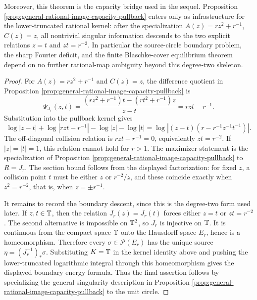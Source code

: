 \begin{theorem}
Moreover, this theorem is the capacity bridge used in the sequel.  Proposition \ref{prop:general-rational-image-capacity-pullback} enters only as infrastructure for the lower-truncated rational kernel: after the specialization \(A(z)=rz^2+r^{-1}\), \(C(z)=z\), all nontrivial singular information descends to the two explicit relations \(z=t\) and \(zt=r^{-2}\).  In particular the source-circle boundary problem, the sharp Fourier deficit, and the finite Blaschke-cover equilibrium theorem depend on no further rational-map ambiguity beyond this degree-two skeleton.
\end{theorem}

\begin{proof}
For \(A(z)=rz^2+r^{-1}\) and \(C(z)=z\), the difference quotient in Proposition \ref{prop:general-rational-image-capacity-pullback} is
\[
\Psi_{J_r}(z,t)=\frac{(rz^2+r^{-1})t-(rt^2+r^{-1})z}{z-t}
=rzt-r^{-1}.
\]
Substitution into the pullback kernel gives
\[
\log|z-t|+
\log|rzt-r^{-1}|-
\log|z|-
\log|t|
=
\log\left|(z-t)\left(r-r^{-1}z^{-1}t^{-1}\right)\right|.
\]
The off-diagonal collision relation is \(rzt-r^{-1}=0\), equivalently \(zt=r^{-2}\).  If \(|z|=|t|=1\), this relation cannot hold for \(r>1\).  The maximizer statement is the specialization of Proposition \ref{prop:general-rational-image-capacity-pullback} to \(R=J_r\).  The section bound follows from the displayed factorization: for fixed \(z\), a collision point \(t\) must be either \(z\) or \(r^{-2}/z\), and these coincide exactly when \(z^2=r^{-2}\), that is, when \(z=\pm r^{-1}\).

It remains to record the boundary descent, since this is the degree-two form used later.  If \(z,t\in\mathbb{T}\), then the relation \(J_r(z)=J_r(t)\) forces either \(z=t\) or \(zt=r^{-2}\).  The second alternative is impossible on \(\mathbb{T}^2\), so \(J_r\) is injective on \(\mathbb{T}\).  It is continuous from the compact space \(\mathbb{T}\) onto the Hausdorff space \(E_r\), hence is a homeomorphism.  Therefore every \(\sigma\in\mathcal P(E_r)\) has the unique source \(\eta=(J_r^{-1})_\ast\sigma\).  Substituting \(K=\mathbb{T}\) in the kernel identity above and pushing the lower-truncated logarithmic integral through this homeomorphism gives the displayed boundary energy formula.  Thus the final assertion follows by specializing the general singularity description in Proposition \ref{prop:general-rational-image-capacity-pullback} to the unit circle.
\end{proof}

